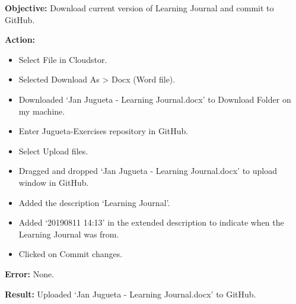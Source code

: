 \documentclass{article}
\begin{document}
\textbf{Objective:} Download current version of Learning Journal and commit to GitHub.

\textbf{Action:}
\begin{itemize}
    \item Select File in Cloudstor.
    \item Selected Download As > Docx (Word file).
    \item Downloaded ‘Jan Jugueta - Learning Journal.docx’ to Download Folder on my machine.
    \item Enter Jugueta-Exercises repository in GitHub.
    \item Select Upload files.
    \item Dragged and dropped ‘Jan Jugueta - Learning Journal.docx’ to upload window in GitHub.
    \item Added the description ‘Learning Journal’.
    \item Added ‘20190811 14:13’ in the extended description to indicate when the Learning Journal was from.
    \item Clicked on Commit changes.
\end{itemize}

\textbf{Error:} None.

\textbf{Result:} Uploaded ‘Jan Jugueta - Learning Journal.docx’ to GitHub.
\end{document}
